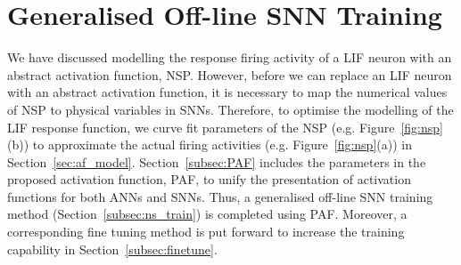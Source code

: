 \section{Generalised Off-line SNN Training}
\label{sec:genrial_SNN}
	We have discussed modelling the response firing activity of a LIF neuron with an abstract activation function, NSP.
	However, before we can replace an LIF neuron with an abstract activation function, it is necessary to map the numerical values of NSP to physical variables in SNNs.
	Therefore, to optimise the modelling of the LIF response function, we curve fit parameters of the NSP (e.g. Figure~\ref{fig:nsp}(b)) to approximate the actual firing activities (e.g. Figure~\ref{fig:nsp}(a)) in Section~\ref{sec:af_model}.
	Section~\ref{subsec:PAF} includes the parameters in the proposed activation function, PAF, to unify the presentation of activation functions for both ANNs and SNNs.
	Thus, a generalised off-line SNN training method (Section~\ref{subsec:ns_train}) is completed using PAF.
	Moreover, a corresponding fine tuning method is put forward to increase the training capability in Section~\ref{subsec:finetune}.
%	
%	
